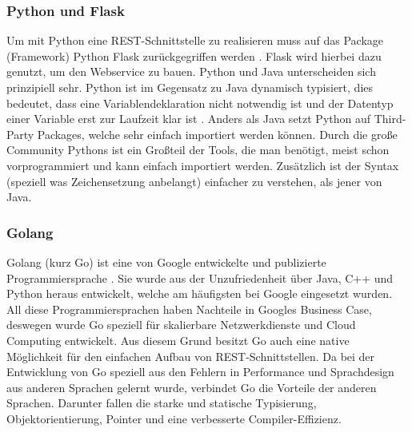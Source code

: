 		\subsubsection{Python und Flask}
		Um mit Python eine REST-Schnittstelle zu realisieren muss auf das Package (Framework) Python Flask zurückgegriffen werden \cite{flaskDocs}. Flask wird hierbei dazu genutzt, um den Webservice zu bauen. Python und Java unterscheiden sich prinzipiell sehr. Python ist im Gegensatz zu Java dynamisch typisiert, dies bedeutet, dass eine Variablendeklaration nicht notwendig ist und der Datentyp einer Variable erst zur Laufzeit klar ist \cite{pythonDocs}. Anders als Java setzt Python auf Third-Party Packages, welche sehr einfach importiert werden können. Durch die große Community Pythons ist ein Großteil der Tools, die man benötigt, meist schon vorprogrammiert und kann einfach importiert werden. Zusätzlich ist der Syntax (speziell was Zeichensetzung anbelangt) einfacher zu verstehen, als jener von Java.
		
		\subsubsection{Golang}
		Golang (kurz Go) ist eine von Google entwickelte und publizierte Programmiersprache \cite{goDocs}. Sie wurde aus der Unzufriedenheit über Java, C++ und Python heraus entwickelt, welche am häufigsten bei Google eingesetzt wurden. All diese Programmiersprachen haben Nachteile in Googles Business Case, deswegen wurde Go speziell für skalierbare Netzwerkdienste und Cloud Computing entwickelt. Aus diesem Grund besitzt Go auch eine native Möglichkeit für den einfachen Aufbau von REST-Schnittstellen. Da bei der Entwicklung von Go speziell aus den Fehlern in Performance und Sprachdesign aus anderen Sprachen gelernt wurde, verbindet Go die Vorteile der anderen Sprachen. Darunter fallen die starke und statische Typisierung, Objektorientierung, Pointer und eine verbesserte Compiler-Effizienz.
		\newpage
